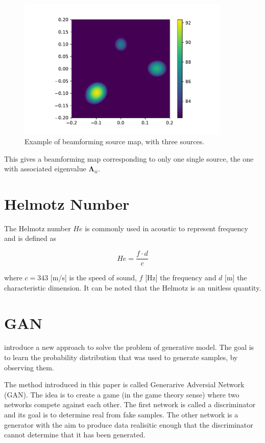 \documentclass[11pt,a4paper,twoside]{report}
\begin{document}
\begin{figure}
    \centering
    \includegraphics[width=0.9\textwidth]{figs/beamforming_example.pdf}
    \caption{Example of beamforming source map, with three sources.}
    \label{fig:beamforming_example}    
\end{figure}

This gives a beamforming map corresponding to only one single source, the one with associated eigenvalue $\mathbf{\Lambda}_{ii}$.

\section{Helmotz Number}

The Helmotz number $He$ is commonly used in acoustic to represent frequency and is defined as

\begin{equation}
    He = \frac{f \cdot d}{c}  
\end{equation}

where $c = 343$ [m/s] is the speed of sound, $f$ [Hz] the frequency and $d$ [m] the characteristic dimension. It can be noted that the Helmotz is an unitless quantity. 

\section{GAN}

\cite{goodfellow2020generative} introduce a new approach to solve the problem of generative model. The goal is to learn the probability distribution that was used to generate samples, by observing them.

The method introduced in this paper is called Generarive Adversial Network (GAN). The idea is to create a game (in the game theory sense) where two networks compete against each other. The first network is called a discriminator and its goal is to determine real from fake samples. The other network is a  generator with the aim to produce data realisitic enough that the discriminator cannot determine that it has been generated.
\end{document}
